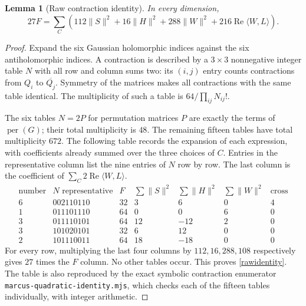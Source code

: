 \documentclass[11pt]{article}
\newcommand{\per}{\operatorname{per}}
\newtheorem{lemma}[theorem]{Lemma}
\begin{document}
\begin{lemma}[Raw contraction identity]\label{raw}
In every dimension,
\begin{equation}\label{rawidentity}
 27F=\sum_C\left(112\|S\|^2+16\|H\|^2+288\|W\|^2
                     +216\operatorname{Re}\langle W,L\rangle\right).
\end{equation}
\end{lemma}
\begin{proof}
Expand the six Gaussian holomorphic indices against the six antiholomorphic
indices. A contraction is described by a $3\times3$ nonnegative integer table
$N$ with all row and column sums two: its $(i,j)$ entry counts contractions
from $Q_i$ to $\overline{Q_j}$. Symmetry of the matrices makes all contractions
with the same table identical. The multiplicity of such a table is
$64/\prod_{ij}N_{ij}!$.

The six tables $N=2P$ for permutation matrices $P$ are exactly the terms of
$\per(G)$; their total multiplicity is $48$. The remaining fifteen tables
have total multiplicity $672$. The following table records the expansion of
each expression, with coefficients already summed over the three choices of
$C$. Entries in the representative column list the nine entries of $N$ row
by row. The last column is the coefficient of
$\sum_C 2\operatorname{Re}\langle W,L\rangle$.
\[
\begin{array}{c|c|r|r|r|r|r}
\text{number}&N\text{ representative}&F&\sum\|S\|^2&\sum\|H\|^2&\sum\|W\|^2&\text{cross}\\\hline
6&002110110&32&3&6&0&4\\
1&011101110&64&0&0&6&0\\
3&011110101&64&12&-12&2&0\\
3&101020101&32&6&12&0&0\\
2&101110011&64&18&-18&0&0
\end{array}
\]
For every row, multiplying the last four columns by $112,16,288,108$
respectively gives $27$ times the $F$ column. No other tables occur.
This proves \eqref{rawidentity}. The table is also reproduced by the exact
symbolic contraction enumerator \texttt{marcus-quadratic-identity.mjs},
which checks each of the fifteen tables individually, with integer arithmetic.
\end{proof}
\end{document}

